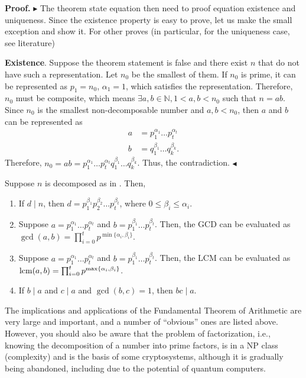 \documentclass[../lecture-notes-148x210.tex]{subfiles}
\begin{document}
\textbf{Proof.} 
$\blacktriangleright$  
The theorem state equation then need to proof equation existence and uniqueness. Since the existence property is 
easy to prove, let us make the small exception and show it. For other proves (in particular, for the uniqueness case, see literature)

\textcolor{green!60!black}{\textbf{Existence}}. Suppose the theorem statement is false and there exist $n$ that do not have such a representation.
Let $n_0$ be the smallest of them.
If $n_0$ is prime, it can be represented as $p_1=n_0$, $\alpha_1=1$, which satisfies the representation. Therefore, $n_0$ must be composite, which means $\exists a, b \in \mathbb{N}, 1 < a, b < n_0$ such that $n = ab$.
Since $n_0$ is the smallest non-decomposable number and $a, b < n_0$, then $a$ and $b$ can be represented as 
\begin{align*}
    a &= p_{1}^{\alpha_{1}} \dots p_{t}^{\alpha_{t}} \\
    b &= q_{1}^{\beta_{1}} \dots q_{k}^{\beta_{k}}.
\end{align*}
Therefore, $n_0 = ab=p_{1}^{\alpha_{1}} \dots p_{t}^{\alpha_{t}} q_{1}^{\beta_{1}} \dots q_{k}^{\beta_{k}}$. Thus, the contradiction. $\blacktriangleleft$  

\begin{corollary}
    Suppose $n$ is decomposed as in . Then,

    \begin{enumerate}
        \item If $d \mid n$, then $d = p_{1}^{\beta_1}p_{2}^{\beta_2} \dots p_{t}^{\beta_t}$, where $0 \leq \beta_i \leq \alpha_i$.
        \item Suppose $a = p_{1}^{\alpha_1} \dots p_{t}^{\alpha_t}$ and $b = p_{1}^{\beta_1} \dots p_{t}^{\beta_t}$. Then, the GCD can be evaluated as $\gcd(a, b) = \prod_{i=0}^{t}p^{\min\{\alpha_i, \beta_i\}}$.
        \item Suppose $a = p_{1}^{\alpha_1} \dots p_{t}^{\alpha_t}$ and $b = p_{1}^{\beta_1} \dots p_{t}^{\beta_t}$. Then, the LCM can be evaluated as $\text{lcm}(a, b) = \prod_{i=0}^{t}p^{\max\{\alpha_i, \beta_i\}}$.
        \item If $b \mid a$ and $c \mid a$ and $\gcd(b, c) = 1$, then $bc \mid a$.
    \end{enumerate}
\end{corollary}

The implications and applications of the Fundamental Theorem of Arithmetic are very large and important, and a number of “obvious” ones are listed above.
However, you should also be aware that the problem of factorization, i.e., knowing the decomposition of a number into prime factors, is in a NP class (complexity) and is the basis of some cryptosystems, although it is gradually being abandoned, including due to the potential of quantum computers.
\end{document}
